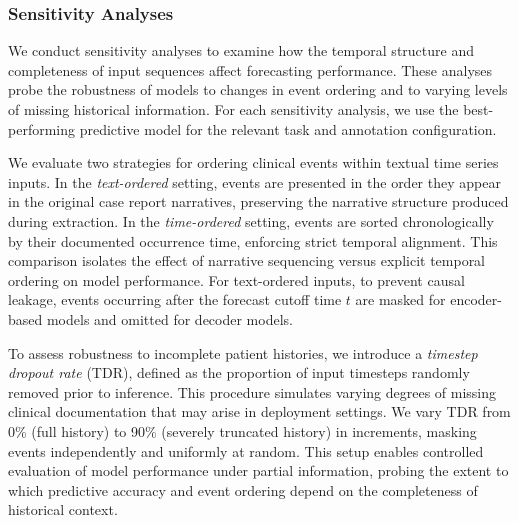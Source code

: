 \subsubsection{Sensitivity Analyses}
We conduct sensitivity analyses to examine how the temporal structure and completeness of input sequences affect forecasting performance.
These analyses probe the robustness of models to changes in event ordering and to varying levels of missing historical information.
For each sensitivity analysis, we use the best-performing predictive model for the relevant task and annotation configuration.

 We evaluate two strategies for ordering clinical events within textual time series inputs. In the \emph{text-ordered} setting, events are presented in the order they appear in the original case report narratives, preserving the narrative structure produced during extraction. In the \emph{time-ordered} setting, events are sorted chronologically by their documented occurrence time, enforcing strict temporal alignment. This comparison isolates the effect of narrative sequencing versus explicit temporal ordering on model performance. For text-ordered inputs, to prevent causal leakage, events occurring after the forecast cutoff time $t$ are masked for encoder-based models and omitted for decoder models.

 To assess robustness to incomplete patient histories, we introduce a \emph{timestep dropout rate} (TDR), defined as the proportion of input timesteps randomly removed prior to inference. This procedure simulates varying degrees of missing clinical documentation that may arise in deployment settings. We vary TDR from 0\% (full history) to 90\% (severely truncated history) in increments, masking events independently and uniformly at random. This setup enables controlled evaluation of model performance under partial information, probing the extent to which predictive accuracy and event ordering depend on the completeness of historical context.
\par
